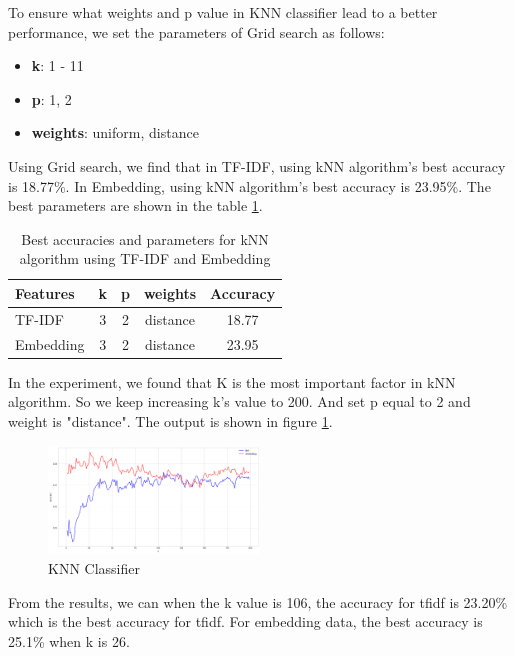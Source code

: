 \documentclass[11pt]{article}
\begin{document}
To ensure what weights and p value in KNN classifier lead to a better performance,
we set the parameters of Grid search as follows:

\begin{itemize}
    \item \textbf{k}: 1 - 11
    \item \textbf{p}: 1, 2
    \item \textbf{weights}: uniform, distance
\end{itemize}

Using Grid search, we find that in TF-IDF, using kNN algorithm's best accuracy is 18.77\%.
In Embedding, using kNN algorithm's best accuracy is 23.95\%.
The best parameters are shown in the table \ref{tab:knn_results}.

\begin{table}[h]
    \centering
    \begin{tabularx}{0.45\textwidth}{@{}lcccc@{}}
    \toprule
    Features    & k & p & weights  & Accuracy    \\ \midrule
    TF-IDF         & 3 & 2 & distance  & 18.77  \\
    Embedding     & 3 & 2 & distance   & 23.95 \\ \bottomrule
    \end{tabularx}
    \caption{Best accuracies and parameters for kNN algorithm using TF-IDF and Embedding}
    \label{tab:knn_results}
\end{table}
    
    

In the experiment, we found that K is the most important factor in kNN algorithm. 
So we keep increasing k's value to 200.
And set p equal to 2 and weight is "distance". 
The output is shown in figure \ref{fig:knn}.

\begin{figure}[h]
    \centering
    \includegraphics[width=0.5\textwidth]{knn_output.png}
    \caption{KNN Classifier}
    \label{fig:knn}
\end{figure}


From the results, we can when the k value is 106, the accuracy for tfidf is 23.20\% which is the best accuracy for tfidf.
For embedding data, the best accuracy is 25.1\% when k is 26.
\end{document}
